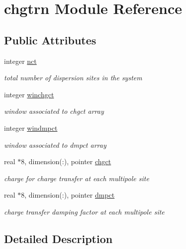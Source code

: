 \hypertarget{classchgtrn}{\section{chgtrn Module Reference}
\label{classchgtrn}
}
\subsection*{Public Attributes}
\begin{DoxyCompactItemize}
\item 
integer \hyperlink{classchgtrn_aa4ef4d48763281fcc2e9da00e35304dd}{nct}
\begin{DoxyCompactList}\small\item\em total number of dispersion sites in the system \end{DoxyCompactList}\item 
integer \hyperlink{classchgtrn_a6249f82de3ead05ff457544f88b30e09}{winchgct}
\begin{DoxyCompactList}\small\item\em window associated to chgct array \end{DoxyCompactList}\item 
integer \hyperlink{classchgtrn_ae6b8df4e210f02a9b8a96ec153e4300d}{windmpct}
\begin{DoxyCompactList}\small\item\em window associated to dmpct array \end{DoxyCompactList}\item 
real $\ast$8, dimension(\-:), pointer \hyperlink{classchgtrn_adc9ab8ca4f57e7687188e561b1966f6c}{chgct}
\begin{DoxyCompactList}\small\item\em charge for charge transfer at each multipole site \end{DoxyCompactList}\item 
real $\ast$8, dimension(\-:), pointer \hyperlink{classchgtrn_a3663e0623912a0b6fad975f6796924af}{dmpct}
\begin{DoxyCompactList}\small\item\em charge transfer damping factor at each multipole site \end{DoxyCompactList}\end{DoxyCompactItemize}


\subsection{Detailed Description}


